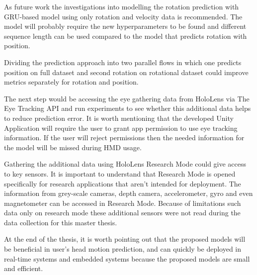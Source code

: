 As future work the investigations into modelling the rotation prediction with GRU-based model using only rotation and velocity data is recommended. The model will probably require the new hyperparameters to be found and different sequence length can be used compared to the model that predicts rotation with position. 

Dividing the prediction approach into two parallel flows in which one predicts position on full dataset and second rotation on rotational dataset could improve metrics separately for rotation and position. 

The next step would be accessing the eye gathering data from HoloLens via The Eye Tracking API and run experiments to see whether this additional data helps to reduce prediction error. It is worth mentioning that the developed Unity Application will require the user to grant app permission to use eye tracking information. If the user will reject permissions then the needed information for the model will be missed during HMD usage. 

Gathering the additional data using HoloLens Research Mode could give access to key sensors. It is important to understand that Research Mode is opened specifically for research applications that aren't intended for deployment. The information from grey-scale cameras, depth camera, accelerometer, gyro and even magnetometer can be accessed in Research Mode. Because of limitations such data only on research mode these additional sensors were not read during the data collection for this master thesis. 

At the end of the thesis, it is worth pointing out that the proposed models will be beneficial in user's head motion prediction, and can quickly be deployed in real-time systems and embedded systems because the proposed models are small and efficient.